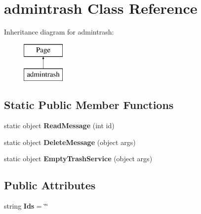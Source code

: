 \hypertarget{classadmintrash}{\section{admintrash Class Reference}
\label{classadmintrash}
}
Inheritance diagram for admintrash\-:\begin{figure}[H]
\begin{center}
\leavevmode
\includegraphics[height=2.000000cm]{classadmintrash}
\end{center}
\end{figure}
\subsection*{Static Public Member Functions}
\begin{DoxyCompactItemize}
\item 
\hypertarget{classadmintrash_a4faca7d4ece5b3733901e6017008485c}{static object {\bfseries Read\-Message} (int id)}\label{classadmintrash_a4faca7d4ece5b3733901e6017008485c}

\item 
\hypertarget{classadmintrash_a3d85f4a3152c90727a604892b3ae2dd2}{static object {\bfseries Delete\-Message} (object args)}\label{classadmintrash_a3d85f4a3152c90727a604892b3ae2dd2}

\item 
\hypertarget{classadmintrash_a599156bd78b8001b73b094815970e88a}{static object {\bfseries Empty\-Trash\-Service} (object args)}\label{classadmintrash_a599156bd78b8001b73b094815970e88a}

\end{DoxyCompactItemize}
\subsection*{Public Attributes}
\begin{DoxyCompactItemize}
\item 
\hypertarget{classadmintrash_ac2f0c4979386918142771eabf5b0f727}{string {\bfseries Ids} = \char`\"{}\char`\"{}}\label{classadmintrash_ac2f0c4979386918142771eabf5b0f727}

\end{DoxyCompactItemize}
